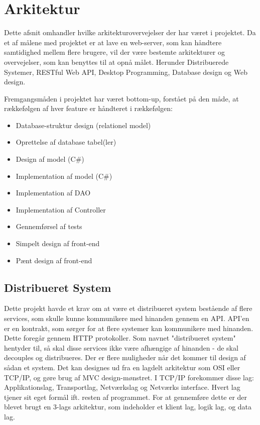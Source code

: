 \chapter{Arkitektur}\label{ch:arkitektur}
Dette afsnit omhandler hvilke arkitekturovervejelser der har været i projektet. Da et af målene med projektet er at lave en web-server, som kan håndtere samtidighed mellem flere brugere, vil der være bestemte arkitekturer og overvejelser, som kan benyttes til at opnå målet. Herunder Distribuerede Systemer, RESTful Web API, Desktop Programming, Database design og Web design.

Fremgangsmåden i projektet har været bottom-up, forstået på den måde, at rækkefølgen af hver feature er håndteret i rækkefølgen:
\begin{itemize}\label{procedure}
    \item Database-struktur design (relationel model)
    \item Oprettelse af database tabel(ler)
    \item Design af model (C\#)
    \item Implementation af model (C\#)
    \item Implementation af DAO
    \item Implementation af Controller
    \item Gennemførsel af tests
    \item Simpelt design af front-end
    \item Pænt design af front-end
\end{itemize}

\section{Distribueret System}\label{sec:distSys}
Dette projekt havde et krav om at være et distribueret system bestående af flere services, som skulle kunne kommunikere med hinanden gennem en API. API'en er en kontrakt, som sørger for at flere systemer kan kommunikere med hinanden\cite{API}. Dette foregår gennem HTTP protokoller\cite{http}.
Som navnet "distribueret system" hentyder til, så skal disse services ikke være afhængige af hinanden - de skal decouples\cite{decoupling} og distribueres. Der er flere muligheder når det kommer til design af sådan et system. Det kan designes ud fra en lagdelt arkitektur som OSI eller TCP/IP\cite{Deitel}, og gøre brug af MVC design-mønstret\cite{MVC}. I TCP/IP forekommer disse lag: Applikationslag, Transportlag, Netværkslag og Netværks interface.
Hvert lag tjener sit eget formål ift. resten af programmet.
For at gennemføre dette er der blevet brugt en 3-lags arkitektur, som indeholder et klient lag, logik lag, og data lag.

